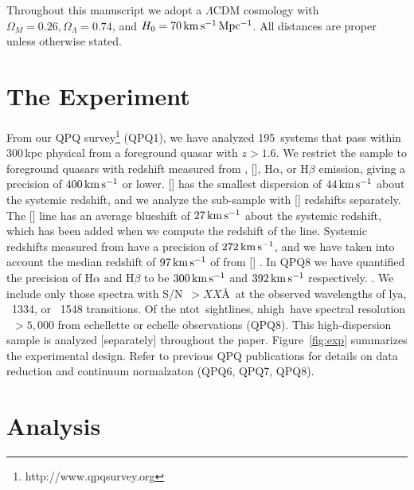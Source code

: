 \documentclass[iop]{emulateapj}
\begin{document}
Throughout this manuscript we adopt a $\Lambda$CDM cosmology with $\Omega_M=0.26, \Omega_\Lambda
=0.74$, and $H_0=70\,{\rm km\,s^{-1}\,Mpc^{-1}}$. All distances are proper unless otherwise 
stated. 

\section{The Experiment}
\label{sec:data}

From our QPQ survey\footnote{http://www.qpqsurvey.org} (QPQ1), we have analyzed 195~systems 
that pass within 300\,kpc physical from a foreground quasar with $z > 1.6$. We restrict the sample 
to foreground quasars with redshift measured from , [], H$\alpha$, or 
H$\beta$ emission, giving a precision of $400\,{\rm km\,s^{-1}}$ or lower. [] has the 
smallest dispersion of $44\,{\rm km\,s^{-1}}$ about the systemic redshift, and we analyze the 
sub-sample with [] redshifts separately. The [] line has an average blueshift 
of $27\,{\rm km\,s^{-1}}$ about the systemic redshift, which has been added when we compute the 
redshift of the line. Systemic redshifts measured from  have a precision of 
$272\,{\rm km\,s^{-1}}$, and we have taken into account the median redshift of 
$97\,{\rm km\,s^{-1}}$ of  from [] \citep{Richards+02}. In QPQ8 we have 
quantified the precision of H$\alpha$ and H$\beta$ to be 
$300\,{\rm km\,s^{-1}}$ and $392\,{\rm km\,s^{-1}}$ respectively. 
\citep{hewittwild}.
We include only those spectra with S/N~$> XX$\AA\ at the
observed wavelengths of lya, ~1334, or 
~1548 transitions.  Of the ntot~sightlines, 
nhigh\ have spectral resolution ~$> 5,000$ from echellette
or echelle observations (QPQ8).  This high-dispersion 
sample is analyzed [separately] throughout the paper.
Figure~\ref{fig:exp} summarizes the experimental design.
Refer to previous QPQ
publications for details on data reduction
and continuum normalzaton (QPQ6, QPQ7, QPQ8).

\section{Analysis}
\label{sec:analysis}
\end{document}
